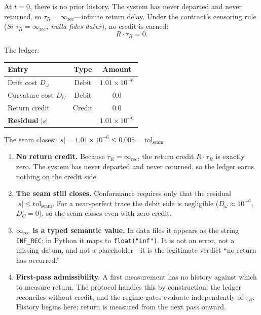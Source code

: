 \documentclass[
  aps,
  prd,
  twocolumn,
  superscriptaddress,
  nofootinbib,
  floatfix
]{revtex4-2}
\newcommand{\tR}{\tau_{\!R}}
\newcommand{\IR}{\infty_{\mathrm{rec}}}
\newcommand{\tolseam}{\mathrm{tol}_{\mathrm{seam}}}
\newcommand{\beq}{\begin{equation}}
\newcommand{\eeq}{\end{equation}}
\newcommand{\INF}{\texttt{INF\_REC}}
\newcommand{\regime}[1]{\textrm{\upshape\scshape#1}}
\newcommand{\conform}{\regime{conformant}}
\begin{document}
At $t = 0$, there is no prior history.  The system has never
departed and never returned, so $\tR = \IR$---infinite return delay.
Under the contract's censoring rule (\emph{Si $\tR = \IR$, nulla
fides datur}), no credit is earned:
\beq
  R \cdot \tR = 0.
\eeq

The ledger:
\begin{center}
\begin{tabular}{lcc}
\toprule
Entry & Type & Amount \\
\midrule
Drift cost $D_\omega$ & Debit & $1.01 \times 10^{-6}$ \\
Curvature cost $D_C$ & Debit & $0.0$ \\
Return credit & Credit & $0.0$ \\
\midrule
\textbf{Residual} $|s|$ & & $1.01 \times 10^{-6}$ \\
\bottomrule
\end{tabular}
\end{center}

The seam closes: $|s| = 1.01 \times 10^{-6} \leq 0.005 = \tolseam$.

\begin{tcolorbox}[
  colback=black!4,
  colframe=black!60,
  boxrule=1.0pt,
  arc=2pt,
  left=6pt, right=6pt, top=6pt, bottom=6pt,
  title={\bfseries\sffamily Why $\tR = \IR$ and the paper is still
    \conform{}},
  coltitle=white,
  colbacktitle=black!70,
  fonttitle=\small,
]
\small
\begin{enumerate}[leftmargin=*,nosep,label=(\arabic*)]
\item \textbf{No return credit.}  Because $\tR = \IR$, the return
  credit $R \cdot \tR$ is exactly zero.  The system has never
  departed and never returned, so the ledger earns nothing on
  the credit side.
\item \textbf{The seam still closes.}  Conformance requires only
  that the residual $|s| \leq \tolseam$.  For a near-perfect trace
  the debit side is negligible ($D_\omega \approx 10^{-6}$,
  $D_C = 0$), so the seam closes even with zero credit.
\item \textbf{$\IR$ is a typed semantic value.}  In data files
  it appears as the string \INF{}; in Python it maps to
  \texttt{float("inf")}.  It is not an error, not a missing datum,
  and not a placeholder---it is the legitimate verdict ``no
  return has occurred.''
\item \textbf{First-pass admissibility.}  A first measurement
  has no history against which to measure return.  The protocol
  handles this by construction: the ledger reconciles without
  credit, and the regime gates evaluate independently of $\tR$.
  History begins here; return is measured from the next pass onward.
\end{enumerate}
\end{tcolorbox}
\end{document}
